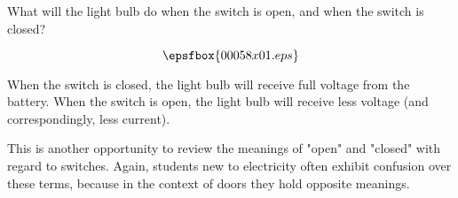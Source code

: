 

What will the light bulb do when the switch is open, and when the switch is closed?

$$\epsfbox{00058x01.eps}$$







When the switch is closed, the light bulb will receive full voltage from the battery.  When the switch is open, the light bulb will receive less voltage (and correspondingly, less current).







This is another opportunity to review the meanings of "open" and "closed" with regard to switches.  Again, students new to electricity often exhibit confusion over these terms, because in the context of doors they hold opposite meanings.




